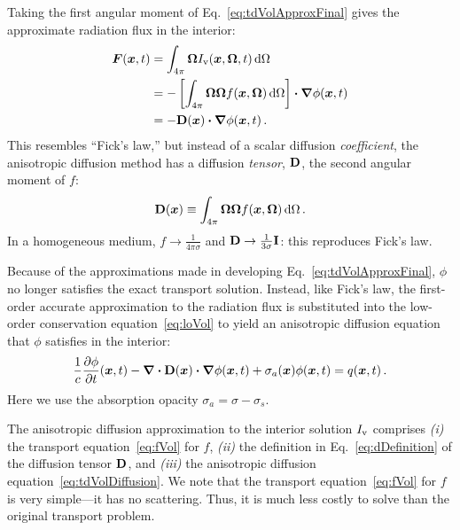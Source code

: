 \thesisclearpage
Taking the first angular moment of Eq.~\eqref{eq:tdVolApproxFinal} gives the
approximate radiation flux in the interior:
\begin{align} \nonumber
  \bm{F}(\bm{x},t) &= \int_{4\pi} \bm{\Omega} I_\mathrm{v}(\bm{x},\bm{\Omega},t)
  \mathop{}\!\mathrm{d}\Omega
  \\ \nonumber
  &= - \left[ \int_{4\pi} \bm{\Omega} \bm{\Omega} f(\bm{x}, \bm{\Omega}) \mathop{}\!\mathrm{d}\Omega
  \right] \bm{\cdot} \bm{\nabla} \phi(\bm{x},t)
  \\ \label{eq:adFicks}
  &= - \mathbf{D}(\bm{x}) \bm{\cdot} \bm{\nabla} \phi(\bm{x},t) \,.
\end{align}
This resembles ``Fick's law,'' but instead of a scalar diffusion
\emph{coefficient},
the anisotropic diffusion method has a diffusion \emph{tensor}, $\mathbf{D}$, the
second angular moment of $f$:
\begin{equation}\label{eq:dDefinition}
  \mathbf{D}(\bm{x}) \equiv \int_{4\pi} \bm{\Omega} \bm{\Omega}
  f(\bm{x}, \bm{\Omega}) \mathop{}\!\mathrm{d}\Omega \,.
\end{equation}
In a homogeneous medium, $f\to\frac{1}{4\pi\sigma}$ and
$\mathbf{D}\to\frac{1}{3\sigma}\mathbf{I}$: this reproduces Fick's law.

Because of the approximations made in developing Eq.~\eqref{eq:tdVolApproxFinal},
$\phi$ no longer satisfies the exact transport solution. Instead, like Fick's
law, the first-order accurate approximation to the radiation flux is substituted
into the low-order conservation equation~\eqref{eq:loVol} to yield an
anisotropic diffusion equation that $\phi$ satisfies in the interior:
\begin{equation} \label{eq:tdVolDiffusion}
\frac{1}{c} \frac{\partial \phi}{\partial t} (\bm{x}, t)
  - \bm{\nabla} \bm{\cdot} \mathbf{D}(\bm{x}) \bm{\cdot} \bm{\nabla} \phi(\bm{x},t)
  + \sigma_a(\bm{x}) \phi(\bm{x}, t)
 = q(\bm{x},t)\,.
\end{equation}
Here we use the absorption opacity $\sigma_a = \sigma - \sigma_s$.

The anisotropic diffusion approximation to the interior solution $I_\mathrm{v}$
comprises \textsl{(i)} the transport equation~\eqref{eq:fVol} for $f$,
\textsl{(ii)} the definition in Eq.~\eqref{eq:dDefinition} of the diffusion
tensor $\mathbf{D}$, and \textsl{(iii)} the anisotropic diffusion
equation~\eqref{eq:tdVolDiffusion}. We note that the transport
equation~\eqref{eq:fVol} for $f$
is very simple---it has no scattering. Thus, it is much less costly to solve
than the original transport problem.

